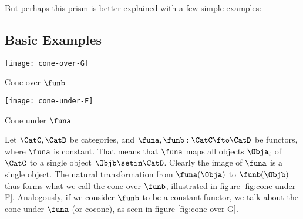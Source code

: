\begin{figure*}[h]
    \centering
    \begin{ctdefinitionshade}
        \small
    \end{ctdefinitionshade}
    \caption{}
    \label{fig:nat_trans_graphically}
\end{figure*}

But perhaps this prism is better explained with a few simple examples:

\subsection{Basic Examples}
\begin{marginfigure}
    \centering
    \texttt{[image: cone-over-G]}
    \caption{Cone over $\funb$}
    \label{fig:cone-over-G}

    \begin{marginfigure}
        \centering
        \texttt{[image: cone-under-F]}
        \label{fig:cone-under-F}
        \caption{Cone under $\funa$}
    \end{marginfigure}

\end{marginfigure}
\begin{example}
    Let $\CatC, \CatD$ be categories, and $\funa, \funb:\CatC\fto\CatD$ be functors, where $\funa$ is constant.
    That means that $\funa$ maps all objects $\Obja_i$ of $\CatC$ to a single object $\Objb \setin \CatD$.
    Clearly the image of $\funa$ is a single object.
    The natural transformation from $\funa(\Obja)$ to $\funb(\Objb)$ thus forms what we call the cone over $\funb$, illustrated in figure \cref{fig:cone-under-F}.
    Analogously, if we consider $\funb$ to be a constant functor, we talk about the cone under $\funa$ (or cocone), as seen in figure \cref{fig:cone-over-G}.
\end{example}

